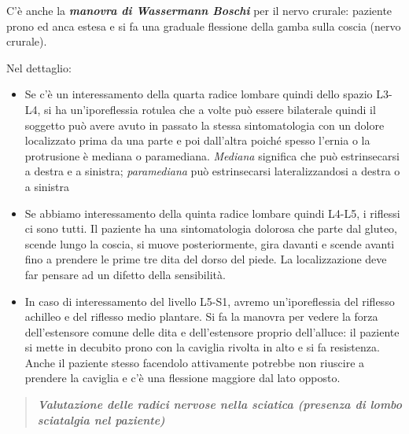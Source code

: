 \documentclass[]{article}
\begin{document}
C'è anche la \textbf{\emph{manovra di Wassermann Boschi}} per il nervo
crurale: paziente prono ed anca estesa e si fa una graduale flessione
della gamba sulla coscia (nervo crurale).

Nel dettaglio:

\begin{itemize}
\item
  Se c'è un interessamento della quarta radice lombare quindi dello
  spazio L3-L4, si ha un'iporeflessia rotulea che a volte può essere
  bilaterale quindi il soggetto può avere avuto in passato la stessa
  sintomatologia con un dolore localizzato prima da una parte e poi
  dall'altra poiché spesso l'ernia o la protrusione è mediana o
  paramediana. \emph{Mediana} significa che può estrinsecarsi a destra e
  a sinistra; \emph{paramediana} può estrinsecarsi lateralizzandosi a
  destra o a sinistra
\item
  Se abbiamo interessamento della quinta radice lombare quindi L4-L5, i
  riflessi ci sono tutti. Il paziente ha una sintomatologia dolorosa che
  parte dal gluteo, scende lungo la coscia, si muove posteriormente,
  gira davanti e scende avanti fino a prendere le prime tre dita del
  dorso del piede. La localizzazione deve far pensare ad un difetto
  della sensibilità.
\item
  In caso di interessamento del livello L5-S1, avremo un'iporeflessia
  del riflesso achilleo e del riflesso medio plantare. Si fa la manovra
  per vedere la forza dell'estensore comune delle dita e dell'estensore
  proprio dell'alluce: il paziente si mette in decubito prono con la
  caviglia rivolta in alto e si fa resistenza. Anche il paziente stesso
  facendolo attivamente potrebbe non riuscire a prendere la caviglia e
  c'è una flessione maggiore dal lato opposto.
\end{itemize}

\begin{quote}
\emph{\textbf{\emph{Valutazione delle radici nervose nella sciatica
(presenza di lombo sciatalgia nel paziente)}}}
\end{quote}
\end{document}
